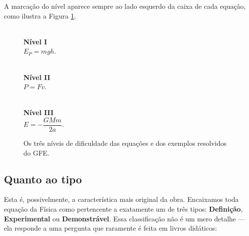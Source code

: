 A marcação do nível aparece sempre ao lado esquerdo da caixa de cada equação, como
ilustra a Figura \ref{fig:comousar_niveis}.

\begin{figure}[!h]
\centering
{}
\begin{minipage}[t]{0.3\linewidth}
\begin{tcolorbox}[secnivelIlustr]
  \raggedleft\grafoI\\[6pt]
\tcblower
  {\small\bfseries Nível I}\\[4pt]
  {\small $\boxed{E_P=mgh.}$}
\end{tcolorbox}
\end{minipage}\hfill
\begin{minipage}[t]{0.3\linewidth}
\begin{tcolorbox}[secnivelIlustr]
  \raggedleft\grafoII\\[6pt]
\tcblower
  {\small\bfseries Nível II}\\[4pt]
  {\small $\boxed{P=F  v.}$}
\end{tcolorbox}
\end{minipage}\hfill
\begin{minipage}[t]{0.3\linewidth}
\begin{tcolorbox}[secnivelIlustr]
  \raggedleft\grafoIII\\[6pt]
\tcblower
  {\small\bfseries Nível III}\\[4pt]
  {\small $\boxed{E =  -\dfrac{GMm}{2a}.}$}
\end{tcolorbox}
\end{minipage}
\caption{Os três níveis de dificuldade das equações e dos exemplos resolvidos do GFE.}
\label{fig:comousar_niveis}
\end{figure}


\subsection*{Quanto ao tipo}

Esta é, possivelmente, a característica mais original da obra. Encaixamos toda equação da Física
como pertencente a exatamente um de três tipos: \textbf{Definição}, \textbf{Experimental} ou
\textbf{Demonstrável}. Essa classificação não é um mero detalhe --- ela
responde a uma pergunta que raramente é feita em livros didáticos:

